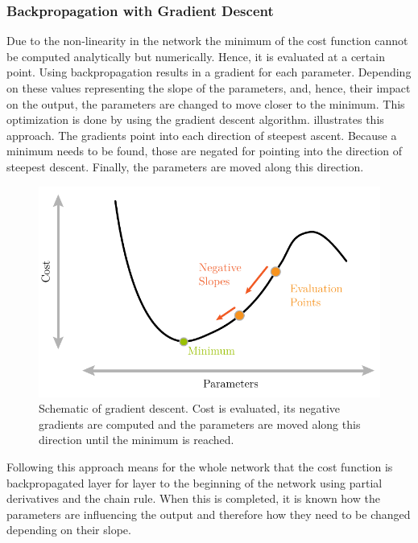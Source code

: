 \subsubsection{Backpropagation with Gradient Descent}
\label{sec:training-gradient-descent}
Due to the non-linearity in the network the minimum of the cost function cannot be computed analytically but numerically.
Hence, it is evaluated at a certain point.
Using backpropagation\cite{rumelhart1986learning}\cite{Goodfellow-et-al-2016} results in a gradient for each parameter.
Depending on these values representing the slope of the parameters, and, hence, their impact on the output, the parameters are changed to move closer to the minimum.
This optimization is done by using the gradient descent algorithm\cite{kiefer1952}\cite{robbins1951}.
 illustrates this approach.
The gradients point into each direction of steepest ascent.
Because a minimum needs to be found, those are negated for pointing into the direction of steepest descent.
Finally, the parameters are moved along this direction.
\begin{figure}
	\centering
	\includegraphics{images/gradient_descent.pdf}
	\caption[Schematic of Gradient Descent]{Schematic of gradient descent. Cost is evaluated, its negative gradients are computed and the parameters are moved along this direction until the minimum is reached.}
	\label{fig:gradient-descent}
\end{figure}
Following this approach means for the whole network that the cost function is backpropagated layer for layer to the beginning of the network using partial derivatives and the chain rule.
When this is completed, it is known how the parameters are influencing the output and therefore how they need to be changed depending on their slope.

